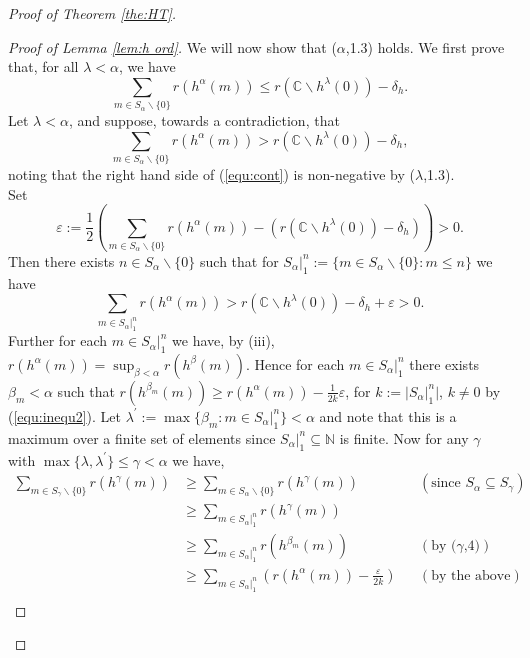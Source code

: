 \documentclass{strippedproc-l}
\theoremstyle{definition}
\theoremstyle{remark}
\numberwithin{equation}{section}
\begin{document}
\begin{proof}[Proof of Theorem \ref{the:HT}]
\begin{proof}[Proof of Lemma \ref{lem:h ord}]
We will now show that ($\alpha$,1.3) holds. We first prove that, for all $\lambda<\alpha$, we have
\begin{equation}
\sum_{m\in S_{\alpha}\backslash\{0\}}r(h^{\alpha}(m))\le r(\mathbb{C}\backslash h^{\lambda}(0))-\delta_{h}.
\label{equ:inequ1}
\end{equation}
Let $\lambda<\alpha$, and suppose, towards a contradiction, that 
\begin{equation}
\sum_{m\in S_{\alpha}\backslash\{0\}}r(h^{\alpha}(m))>r(\mathbb{C}\backslash h^{\lambda}(0))-\delta_{h},
\label{equ:cont}
\end{equation}
noting that the right hand side of (\ref{equ:cont}) is non-negative by ($\lambda$,1.3).\\ 
Set
\begin{equation*}
\varepsilon:=\frac{1}{2}\left(\sum_{m\in S_{\alpha}\backslash\{0\}}r(h^{\alpha}(m))-(r(\mathbb{C}\backslash h^{\lambda}(0))-\delta_{h})\right)>0.
\end{equation*}
Then there exists $n\in S_{\alpha}\backslash\{0\}$ such that for $S_{\alpha}|_{1}^{n}:=\{m\in S_{\alpha}\backslash\{0\}:m\le n\}$ we have 
\begin{equation}
\sum_{m\in S_{\alpha}|_{1}^{n}}r(h^{\alpha}(m))>r(\mathbb{C}\backslash h^{\lambda}(0))-\delta_{h}+\varepsilon>0. 
\label{equ:inequ2}
\end{equation}
Further for each $m\in S_{\alpha}|_{1}^{n}$ we have, by (iii), $r(h^{\alpha}(m))=\sup_{\beta<\alpha}r(h^{\beta}(m))$. Hence for each $m\in S_{\alpha}|_{1}^{n}$ there exists $\beta_{m}<\alpha$ such that $r(h^{\beta_{m}}(m))\ge r(h^{\alpha}(m))-\frac{1}{2k}\varepsilon$, for $k:=|S_{\alpha}|_{1}^{n}|$, $k\not=0$ by (\ref{equ:inequ2}). Let $\lambda^{'}:=\max\{\beta_{m}:m\in S_{\alpha}|_{1}^{n}\}<\alpha$ and note that this is a maximum over a finite set of elements since $S_{\alpha}|_{1}^{n}\subseteq\mathbb{N}$ is finite. Now for any $\gamma$ with $\max\{\lambda,\lambda^{'}\}\le\gamma<\alpha$ we have,
\begin{align*}
\sum_{m\in S_{\gamma}\backslash\{0\}}r(h^{\gamma}(m))&\ge\sum_{m\in S_{\alpha}\backslash\{0\}}r(h^{\gamma}(m))& &(\mbox{since }S_{\alpha}\subseteq S_{\gamma})&\\
&\ge\sum_{m\in S_{\alpha}|_{1}^{n}}r(h^{\gamma}(m))& &&\\
&\ge\sum_{m\in S_{\alpha}|_{1}^{n}}r(h^{\beta_{m}}(m))& &(\mbox{by ($\gamma$,4)})&\\
&\ge\sum_{m\in S_{\alpha}|_{1}^{n}}(r(h^{\alpha}(m))-\frac{\varepsilon}{2k})& &(\mbox{by the above})&\\

\end{align*}
\end{proof}
\end{proof}
\end{document}

